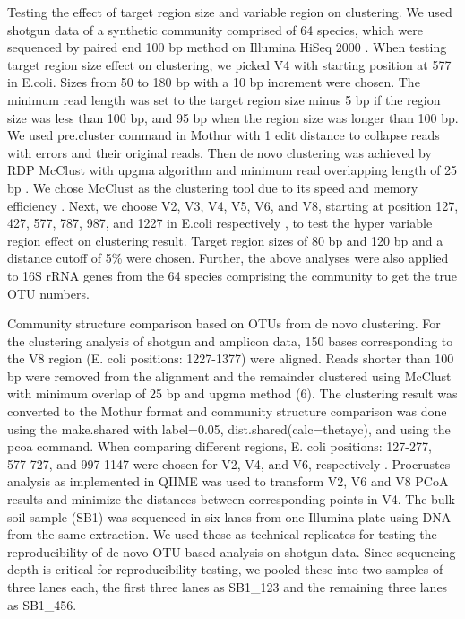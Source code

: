 \documentclass[]{msu-thesis}
\begin{document}
Testing the effect of target region size and variable region on clustering. We used shotgun data of a synthetic community comprised of 64 species, which were sequenced by paired end 100 bp method on Illumina HiSeq 2000 \cite{shakya_comparative_2013}. When testing target region size effect on clustering, we picked V4 with starting position at 577 in E.coli. Sizes from 50 to 180 bp with a 10 bp increment were chosen. The minimum read length was set to the target region size minus 5 bp if the region size was less than 100 bp, and 95 bp when the region size was longer than 100 bp. We used pre.cluster command in Mothur with 1 edit distance to collapse reads with errors and their original reads. Then de novo clustering was achieved by RDP McClust with upgma algorithm and minimum read overlapping length of 25 bp \cite{cole_ribosomal_2014}. We chose McClust as the clustering tool due to its speed and memory efficiency \cite{cole_ribosomal_2014,loewenstein_efficient_2008}. Next, we choose V2, V3, V4, V5, V6, and V8, starting at position 127, 427, 577, 787, 987, and 1227 in E.coli respectively \cite{neefs_compilation_1993}, to test the hyper variable region effect on clustering result. Target region sizes of 80 bp and 120 bp and a distance cutoff of 5\% were chosen. Further, the above analyses were also applied to 16S rRNA genes from the 64 species comprising the community to get the true OTU numbers.

Community structure comparison based on OTUs from de novo clustering. For the clustering analysis of shotgun and amplicon data, 150 bases corresponding to the V8 region (E. coli positions: 1227-1377) were aligned. Reads shorter than 100 bp were removed from the alignment and the remainder clustered using McClust with minimum overlap of 25 bp and upgma method (6). The clustering result was converted to the Mothur format and community structure comparison was done using the make.shared with label=0.05, dist.shared(calc=thetayc), and using the pcoa command. When comparing different regions, E. coli positions: 127-277, 577-727, and 997-1147 were chosen for V2, V4, and V6, respectively \cite{neefs_compilation_1993}. Procrustes analysis as implemented in QIIME was used to transform V2, V6 and V8 PCoA results and minimize the distances between corresponding points in V4. The bulk soil sample (SB1) was sequenced in six lanes from one Illumina plate using DNA from the same extraction. We used these as technical replicates for testing the reproducibility of de novo OTU-based analysis on shotgun data. Since sequencing depth is critical for reproducibility testing, we pooled these into two samples of three lanes each, the first three lanes as SB1\_123 and the remaining three lanes as SB1\_456.
\end{document}
